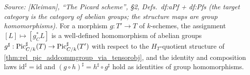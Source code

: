 \begin{lemma}\leanok
  \label{lem:rel_pic_sharp_functorial}

  \textit{Source: [Kleiman], ``The Picard scheme'', \S 2,
  Defs.~df:aPf + df:Pfs (the target category is the category of abelian
  groups; the structure maps are group homomorphisms).}
  For a morphism \(g : T' \to T\) of \(k\)-schemes, the assignment
  \([L] \mapsto [g_C^* L]\) is a well-defined homomorphism of abelian groups
  \(g^\sharp : \operatorname{Pic}^\sharp_{C/k}(T) \to \operatorname{Pic}^\sharp_{C/k}(T')\) with respect
  to the \(H_T\)-quotient structure of
  \cref{thm:rel_pic_addcommgroup_via_tensorobj}, and the identity and
  composition laws \(\mathrm{id}^\sharp = \mathrm{id}\) and
  \((g \circ h)^\sharp = h^\sharp \circ g^\sharp\) hold as identities of group
  homomorphisms.
\end{lemma}

